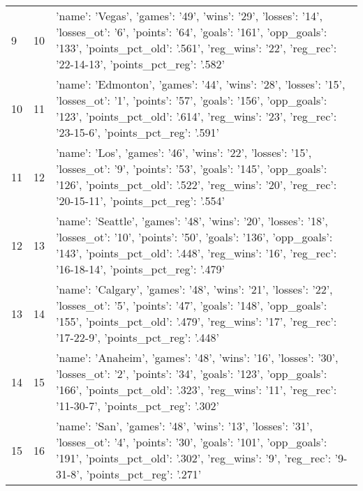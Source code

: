\begin{tabular}{lrl}
9 & 10 & {'name': 'Vegas', 'games': '49', 'wins': '29', 'losses': '14', 'losses_ot': '6', 'points': '64', 'goals': '161', 'opp_goals': '133', 'points_pct_old': '.561', 'reg_wins': '22', 'reg_rec': '22-14-13', 'points_pct_reg': '.582'} \\
10 & 11 & {'name': 'Edmonton', 'games': '44', 'wins': '28', 'losses': '15', 'losses_ot': '1', 'points': '57', 'goals': '156', 'opp_goals': '123', 'points_pct_old': '.614', 'reg_wins': '23', 'reg_rec': '23-15-6', 'points_pct_reg': '.591'} \\
11 & 12 & {'name': 'Los', 'games': '46', 'wins': '22', 'losses': '15', 'losses_ot': '9', 'points': '53', 'goals': '145', 'opp_goals': '126', 'points_pct_old': '.522', 'reg_wins': '20', 'reg_rec': '20-15-11', 'points_pct_reg': '.554'} \\
12 & 13 & {'name': 'Seattle', 'games': '48', 'wins': '20', 'losses': '18', 'losses_ot': '10', 'points': '50', 'goals': '136', 'opp_goals': '143', 'points_pct_old': '.448', 'reg_wins': '16', 'reg_rec': '16-18-14', 'points_pct_reg': '.479'} \\
13 & 14 & {'name': 'Calgary', 'games': '48', 'wins': '21', 'losses': '22', 'losses_ot': '5', 'points': '47', 'goals': '148', 'opp_goals': '155', 'points_pct_old': '.479', 'reg_wins': '17', 'reg_rec': '17-22-9', 'points_pct_reg': '.448'} \\
14 & 15 & {'name': 'Anaheim', 'games': '48', 'wins': '16', 'losses': '30', 'losses_ot': '2', 'points': '34', 'goals': '123', 'opp_goals': '166', 'points_pct_old': '.323', 'reg_wins': '11', 'reg_rec': '11-30-7', 'points_pct_reg': '.302'} \\
15 & 16 & {'name': 'San', 'games': '48', 'wins': '13', 'losses': '31', 'losses_ot': '4', 'points': '30', 'goals': '101', 'opp_goals': '191', 'points_pct_old': '.302', 'reg_wins': '9', 'reg_rec': '9-31-8', 'points_pct_reg': '.271'} \\
\end{tabular}
